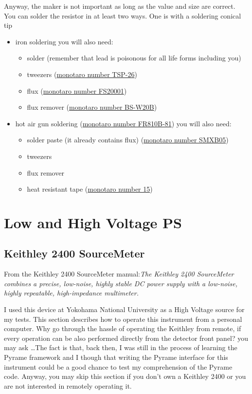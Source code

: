 Anyway, the maker is not important as long as the value and size are correct.
You can solder the resistor in at least two ways. One is with a soldering
conical tip
\begin{itemize}
\item iron soldering you will also need:
  \begin{itemize}
  \item solder (remember that lead is poisonous for all life forms including
    you)
  \item tweezers
    (\href{https://www.monotaro.com/p/0840/4873/?displayId=5}{monotaro number
      TSP-26})
  \item flux (\href{https://www.monotaro.com/p/3952/8833/?displayId=5}{monotaro
      number FS20001})
  \item flux remover
    (\href{https://www.monotaro.com/p/6215/1382/?displayId=5}{monotaro number
      BS-W20B})
  \end{itemize}
\item hot air gun soldering
  (\href{https://www.monotaro.com/p/4893/0954/?displayId=5}{monotaro number
    FR810B-81}) you will also need:
  \begin{itemize}
  \item solder paste (it already contains flux)
    (\href{https://www.monotaro.com/p/1001/3097/?displayId=5}{monotaro number
      SMXB05})
  \item tweezers
  \item flux remover
  \item heat resistant tape
    (\href{https://www.monotaro.com/p/5638/8526/?displayId=5}{monotaro number
      15})
  \end{itemize}
\end{itemize}

\section{Low and High Voltage PS}
\subsection{Keithley 2400 SourceMeter}
From the Keithley 2400 SourceMeter manual:\textit{The Keithley 2400 SourceMeter
  combines a precise, low-noise, highly stable DC power supply with a low-noise,
  highly repeatable, high-impedance multimeter.}

I used this device at Yokohama National University as a High Voltage source for
my tests. This section describes how to operate this instrument from a personal
computer. Why go through the hassle of operating the Keithley from remote, if
every operation can be also performed directly from the detector front panel?
you may ask \dots The fact is that, back then, I was still in the process of
learning the Pyrame framework and I though that writing the Pyrame interface for
this instrument could be a good chance to test my comprehension of the Pyrame
code. Anyway, you may skip this section if you don't own a Keithley 2400 or you
are not interested in remotely operating it.

